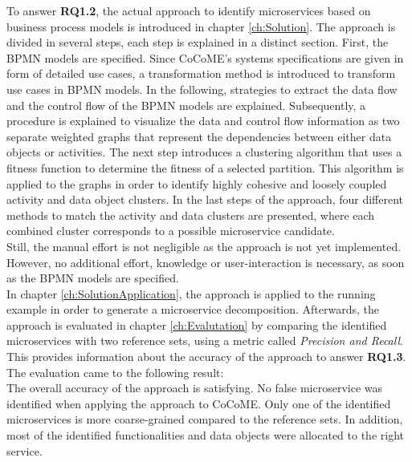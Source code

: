 \noindent
To answer \textbf{RQ1.2}, the actual approach to identify microservices based on business process models is introduced in chapter \ref{ch:Solution}. The approach is divided in several steps, each step is explained in a distinct section. First, the BPMN models are specified. Since CoCoME's systems specifications are given in form of detailed use cases, a transformation method is introduced to transform use cases in BPMN models. In the following, strategies to extract the data flow and the control flow of the BPMN models are explained. Subsequently, a procedure is explained to visualize the data and control flow information as two separate weighted graphs that represent the dependencies between either data objects or activities. The next step introduces a clustering algorithm that uses a fitness function to determine the fitness of a selected partition. This algorithm is applied to the graphs in order to identify highly cohesive and loosely coupled activity and data object clusters. In the last steps of the approach, four different methods to match the activity and data clusters are presented, where each combined cluster corresponds to a possible microservice candidate. \\
Still, the manual effort is not negligible as the approach is not yet implemented. However, no additional effort, knowledge or user-interaction is necessary, as soon as the BPMN models are specified. \\

\noindent
In chapter \ref{ch:SolutionApplication}, the approach is applied to the running example in order to generate a microservice decomposition. Afterwards, the approach is evaluated in chapter \ref{ch:Evalutation} by comparing the identified microservices with two reference sets, using a metric called \textit{Precision and Recall}. This provides information about the accuracy of the approach to answer \textbf{RQ1.3}. The evaluation came to the following result:\\
The overall accuracy of the approach is satisfying. No false microservice was identified when applying the approach to CoCoME. Only one of the identified microservices is more coarse-grained compared to the reference sets. In addition, most of the identified functionalities and data objects were allocated to the right service. \\







